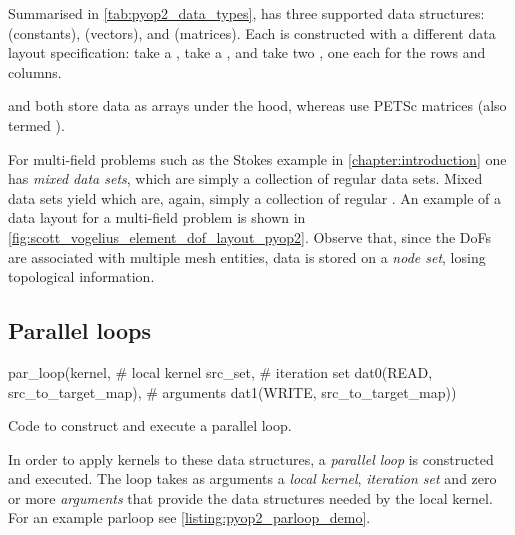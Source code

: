 \documentclass[thesis]{subfiles}
\begin{document}
Summarised in \cref{tab:pyop2_data_types},  has three supported data structures:  (constants),  (vectors), and  (matrices).
Each is constructed with a different data layout specification:  take a ,  take a , and  take two , one each for the rows and columns.

 and  both store data as \numpy arrays under the hood, whereas  use PETSc matrices (also termed ).

For multi-field problems such as the Stokes example in \cref{chapter:introduction} one has \textit{mixed data sets}, which are simply a collection of regular data sets.
Mixed data sets yield  which are, again, simply a collection of regular .
An example of a  data layout for a multi-field problem is shown in \cref{fig:scott_vogelius_element_dof_layout_pyop2}.
Observe that, since the DoFs are associated with multiple mesh entities, data is stored on a \emph{node set}, losing topological information.

\subsection{Parallel loops}

\begin{listing}
  \centering
  \begin{minipage}{.9\textwidth}
    \begin{pyalg2}
      par_loop(kernel,                          # local kernel
               src_set,                         # iteration set
               dat0(READ, src_to_target_map),   # arguments
               dat1(WRITE, src_to_target_map))
    \end{pyalg2}
  \end{minipage}
  \caption{
    Code to construct and execute a  parallel loop.
  }
  \label{listing:pyop2_parloop_demo}
\end{listing}

In order to apply kernels to these data structures, a \textit{parallel loop} is constructed and executed.
The loop takes as arguments a \textit{local kernel}, \textit{iteration set} and zero or more \textit{arguments} that provide the data structures needed by the local kernel.
For an example parloop see \cref{listing:pyop2_parloop_demo}.
\end{document}
